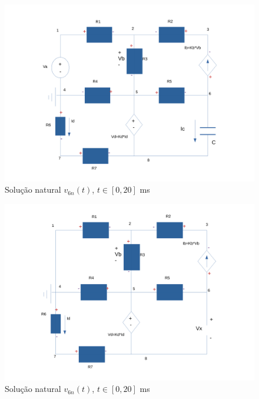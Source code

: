\begin{figure}[ht] \centering
\includegraphics[width=0.7\linewidth]{Circuito1.pdf}
\caption{Solução natural $v_{6n}(t)$, $t\in[0,20]$ ms}
\label{fig:snat}
\end{figure}

\begin{figure}[ht] \centering
\includegraphics[width=0.7\linewidth]{Circuito2.pdf}
\caption{Solução natural $v_{6n}(t)$, $t\in[0,20]$ ms}
\label{fig:snat}
\end{figure}

\clearpage
